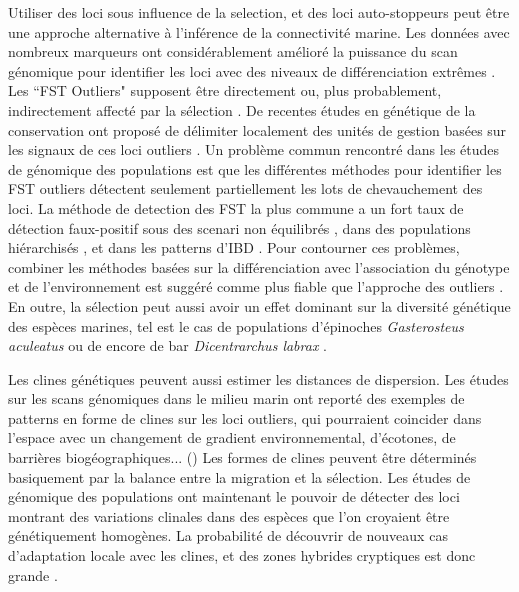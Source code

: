 \documentclass[a4paper,11pt,twoside]{report}
\begin{document}
Utiliser des loci sous influence de la selection, et des loci auto-stoppeurs peut être une approche alternative à l'inférence de la connectivité marine. Les données avec nombreux marqueurs ont considérablement amélioré la puissance du scan génomique pour identifier les loci avec des niveaux de différenciation extrêmes \citep{stapley2010adaptation}. Les ``FST Outliers" supposent être directement ou, plus probablement, indirectement affecté par la sélection \citep{luikart2003power}\citep{storz2005invited}. De recentes études en génétique de la conservation ont proposé de délimiter localement des unités de gestion basées sur les signaux de ces loci outliers \citep{funk2012harnessing}\citep{nielsen2012gene}. Un problème commun rencontré dans les études de génomique des populations est que les différentes méthodes pour identifier les FST outliers détectent seulement partiellement les lots de chevauchement des loci. La méthode de detection des FST la plus commune a un fort taux de détection faux-positif sous des scenari non équilibrés \citep{lotterhos2014evaluation}, dans des populations hiérarchisés \citep{excoffier2009detecting}, et dans les patterns d'IBD \cite{fourcade2013local}. Pour contourner ces problèmes, combiner les méthodes basées sur la différenciation avec l'association du génotype et de l'environnement est suggéré comme plus fiable que l'approche des outliers \citep{villemereuil2014genome}. En outre, la sélection peut aussi avoir un effet dominant sur la diversité génétique des espèces marines, tel est le cas de populations d'épinoches \textit{Gasterosteus aculeatus} \citep{roesti2012genome} ou de encore de bar \textit{Dicentrarchus labrax} \cite{tine2014european}. 

Les clines génétiques peuvent aussi estimer les distances de dispersion. Les études sur les scans génomiques dans le milieu marin ont reporté des exemples de patterns en forme de clines sur les loci outliers, qui pourraient coincider dans l'espace avec un changement de gradient environnemental, d'écotones, de barrières biogéographiques... (\citep{murray2006genomic}\citep{colbeck2011historical}\citep{gagnaire2011within}\citep{limborg2012environmental}) Les formes de clines peuvent être déterminés basiquement par la balance entre la migration et la sélection. Les études de génomique des populations ont maintenant le pouvoir de détecter des loci montrant des variations clinales dans des espèces que l'on croyaient être génétiquement homogènes. La probabilité de découvrir de nouveaux cas d'adaptation locale avec les clines, et des zones hybrides cryptiques est donc grande \citep{bierne2011coupling}. 
\end{document}
